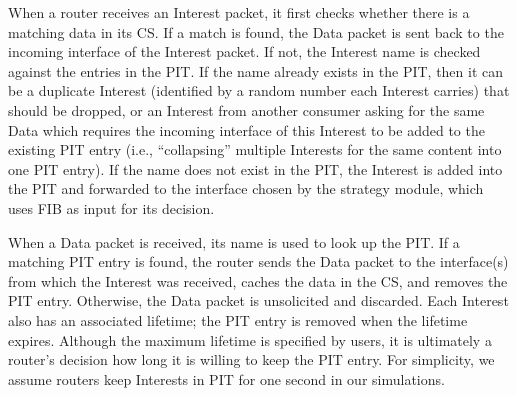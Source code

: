 When a router receives an Interest packet, it first checks whether there is a matching data in its CS.
If a match is found, the Data packet is sent back to the incoming interface of the Interest packet.
If not, the Interest name is checked against the entries in the PIT. 
If the name already exists in the PIT, then it can be a duplicate Interest (identified by a random number each Interest carries) that should be dropped,
or an Interest from another consumer asking for the same Data which requires the incoming interface of this Interest to be added to the existing PIT entry (i.e., ``collapsing'' multiple Interests for the same content into one PIT entry).
If the name does not exist in the PIT, the Interest is added into the PIT and forwarded to the interface chosen by the strategy module, which uses FIB as input for its decision.

When a Data packet is received, its name is used to look up the PIT.
If a matching PIT entry is found,
the router sends the Data packet to the interface(s) from which the Interest was received, caches the data in the CS, and removes the PIT entry.  Otherwise, the Data packet is unsolicited and discarded. 
Each Interest also has an associated lifetime; the PIT entry is removed when the lifetime expires.
Although the maximum lifetime is specified by users, it is ultimately a router's decision how long it is willing to keep the PIT entry.  
For simplicity, we assume routers keep Interests in PIT for one second in our simulations.






